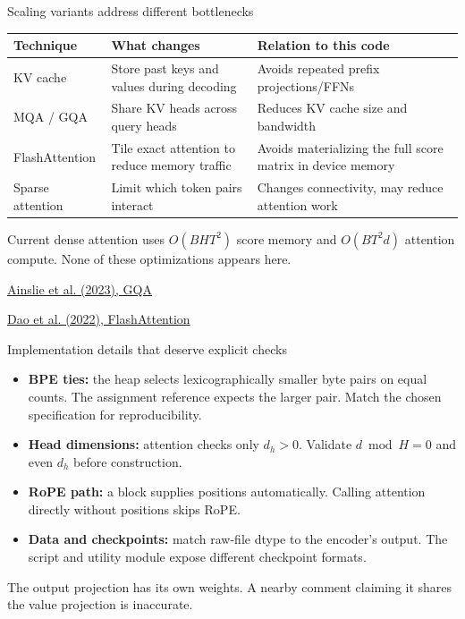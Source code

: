 \documentclass[11pt,aspectratio=169]{beamer}
\newcommand{\paper}[2]{\par{\scriptsize\color{muted}\href{#2}{#1}\par}}
\begin{document}
\begin{frame}{Scaling variants address different bottlenecks}
\small
\begin{tabular}{@{}>{\raggedright\arraybackslash}p{}>{\raggedright\arraybackslash}p{}>{\raggedright\arraybackslash}p{}@{}}
\toprule
Technique & What changes & Relation to this code\\\midrule
KV cache & Store past keys and values during decoding & Avoids repeated prefix projections/FFNs\\[3mm]
MQA / GQA & Share KV heads across query heads & Reduces KV cache size and bandwidth\\[3mm]
FlashAttention & Tile exact attention to reduce memory traffic & Avoids materializing the full score matrix in device memory\\[3mm]
Sparse attention & Limit which token pairs interact & Changes connectivity, may reduce attention work\\\bottomrule
\end{tabular}\par
\par\vspace{2mm}
Current dense attention uses $O(BHT^2)$ score memory and $O(BT^2d)$ attention compute. None of these optimizations appears here.
\paper{Ainslie et al. (2023), GQA}{https://arxiv.org/abs/2305.13245}
\paper{Dao et al. (2022), FlashAttention}{https://arxiv.org/abs/2205.14135}
\end{frame}

\begin{frame}{Implementation details that deserve explicit checks}
\begin{itemize}
\item \textbf{BPE ties:} the heap selects lexicographically smaller byte pairs on equal counts. The assignment reference expects the larger pair. Match the chosen specification for reproducibility.
\item \textbf{Head dimensions:} attention checks only $d_h>0$. Validate $d\bmod H=0$ and even $d_h$ before construction.
\item \textbf{RoPE path:} a block supplies positions automatically. Calling attention directly without positions skips RoPE.
\item \textbf{Data and checkpoints:} match raw-file dtype to the encoder's output. The script and utility module expose different checkpoint formats.
\end{itemize}
\par\vspace{2mm}
The output projection has its own weights. A nearby comment claiming it shares the value projection is inaccurate.
\end{frame}
\end{document}
